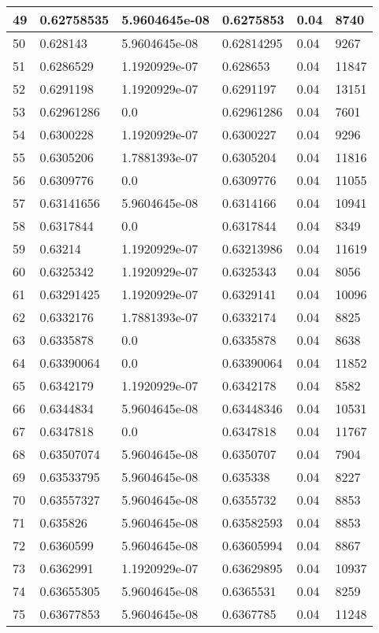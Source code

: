 \begin{longtable}{|l|l|l|l|l|l|}
49 & 0.62758535 & 5.9604645e-08 & 0.6275853 & 0.04 & 8740 \\ \hline 
50 & 0.628143 & 5.9604645e-08 & 0.62814295 & 0.04 & 9267 \\ \hline 
51 & 0.6286529 & 1.1920929e-07 & 0.628653 & 0.04 & 11847 \\ \hline 
52 & 0.6291198 & 1.1920929e-07 & 0.6291197 & 0.04 & 13151 \\ \hline 
53 & 0.62961286 & 0.0 & 0.62961286 & 0.04 & 7601 \\ \hline 
54 & 0.6300228 & 1.1920929e-07 & 0.6300227 & 0.04 & 9296 \\ \hline 
55 & 0.6305206 & 1.7881393e-07 & 0.6305204 & 0.04 & 11816 \\ \hline 
56 & 0.6309776 & 0.0 & 0.6309776 & 0.04 & 11055 \\ \hline 
57 & 0.63141656 & 5.9604645e-08 & 0.6314166 & 0.04 & 10941 \\ \hline 
58 & 0.6317844 & 0.0 & 0.6317844 & 0.04 & 8349 \\ \hline 
59 & 0.63214 & 1.1920929e-07 & 0.63213986 & 0.04 & 11619 \\ \hline 
60 & 0.6325342 & 1.1920929e-07 & 0.6325343 & 0.04 & 8056 \\ \hline 
61 & 0.63291425 & 1.1920929e-07 & 0.6329141 & 0.04 & 10096 \\ \hline 
62 & 0.6332176 & 1.7881393e-07 & 0.6332174 & 0.04 & 8825 \\ \hline 
63 & 0.6335878 & 0.0 & 0.6335878 & 0.04 & 8638 \\ \hline 
64 & 0.63390064 & 0.0 & 0.63390064 & 0.04 & 11852 \\ \hline 
65 & 0.6342179 & 1.1920929e-07 & 0.6342178 & 0.04 & 8582 \\ \hline 
66 & 0.6344834 & 5.9604645e-08 & 0.63448346 & 0.04 & 10531 \\ \hline 
67 & 0.6347818 & 0.0 & 0.6347818 & 0.04 & 11767 \\ \hline 
68 & 0.63507074 & 5.9604645e-08 & 0.6350707 & 0.04 & 7904 \\ \hline 
69 & 0.63533795 & 5.9604645e-08 & 0.635338 & 0.04 & 8227 \\ \hline 
70 & 0.63557327 & 5.9604645e-08 & 0.6355732 & 0.04 & 8853 \\ \hline 
71 & 0.635826 & 5.9604645e-08 & 0.63582593 & 0.04 & 8853 \\ \hline 
72 & 0.6360599 & 5.9604645e-08 & 0.63605994 & 0.04 & 8867 \\ \hline 
73 & 0.6362991 & 1.1920929e-07 & 0.63629895 & 0.04 & 10937 \\ \hline 
74 & 0.63655305 & 5.9604645e-08 & 0.6365531 & 0.04 & 8259 \\ \hline 
75 & 0.63677853 & 5.9604645e-08 & 0.6367785 & 0.04 & 11248 \\ \hline 
\end{longtable}